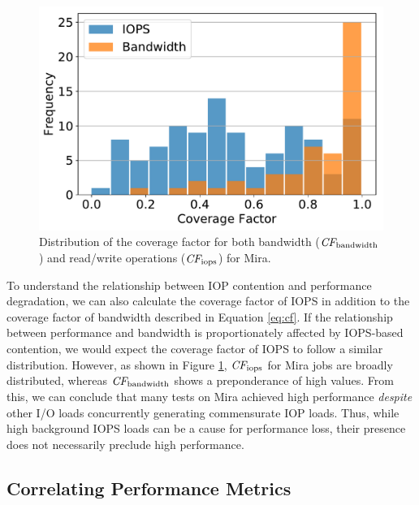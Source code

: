 \begin{figure}[t]
    \centering
    \includegraphics[width=\columnwidth]{figs/hist-cf-bw-and-ops.pdf}
    \caption{Distribution of the coverage factor for both bandwidth ($\textit{CF}_{\textup{bandwidth}}$) and read/write operations ($\textit{CF}_{\textup{iops}}$) for Mira.
    }
    \label{fig:hist-cf-mira}
\end{figure}

To understand the relationship between IOP contention and performance degradation, we can also calculate the coverage factor of IOPS in addition to the coverage factor of bandwidth described in Equation \ref{eq:cf}.
If the relationship between performance and bandwidth is proportionately affected by IOPS-based contention, we would expect the coverage factor of IOPS to follow a similar distribution. 
However, as shown in Figure \ref{fig:hist-cf-mira}, $\textit{CF}_{\textup{iops}}$ for Mira jobs are broadly distributed, whereas $\textit{CF}_{\textup{bandwidth}}$ shows a preponderance of high values.
From this, we can conclude that many tests on Mira achieved high performance \emph{despite} other I/O loads concurrently generating commensurate IOP loads.
Thus, while high background IOPS loads can be a cause for performance loss, their presence does not necessarily preclude high performance.

\subsection{Correlating Performance Metrics} \label{sec:results/correlating}


